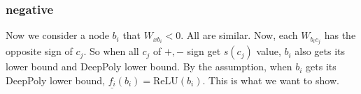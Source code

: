 \documentclass[]{article}
\theoremstyle{definition}
\newcommand{\ReLU}{\mathrm{ReLU}}
\begin{document}
\subsubsection*{negative}Now we consider a node $b_i$ that $W_{xb_i}<0$. All are similar. Now, each $W_{b_ic_j}$ has the opposite sign of $c_j$. So when all $c_j$ of $+,-$ sign get $s(c_j)$ value, $b_i$ also gets its lower bound and DeepPoly lower bound. By the assumption, when $b_i$ gets its DeepPoly lower bound, $\underline{f_i}(b_i)=\ReLU(b_i)$. This is what we want to show.
\end{document}
